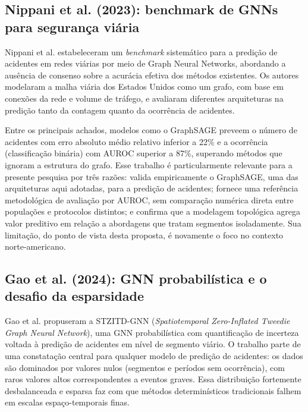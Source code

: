 \documentclass[12pt]{article}
\begin{document}
\subsection{Nippani et al. (2023): benchmark de GNNs para segurança viária}

Nippani et al. \cite{nippani2023} estabeleceram um \textit{benchmark}
sistemático para a predição de acidentes em redes viárias por meio de
Graph Neural Networks, abordando a ausência de consenso sobre a acurácia
efetiva dos métodos existentes. Os autores modelaram a malha viária dos
Estados Unidos como um grafo, com base em conexões da rede e volume de
tráfego, e avaliaram diferentes arquiteturas na predição tanto da
contagem quanto da ocorrência de acidentes.

Entre os principais achados, modelos como o GraphSAGE preveem o número
de acidentes com erro absoluto médio relativo inferior a 22\% e a
ocorrência (classificação binária) com AUROC superior a 87\%, superando
métodos que ignoram a estrutura do grafo. Esse trabalho é particularmente
relevante para a presente pesquisa por três razões: valida
empiricamente o GraphSAGE, uma das arquiteturas aqui adotadas,
para a predição de acidentes; fornece uma referência metodológica de
avaliação por AUROC, sem comparação numérica direta entre populações
e protocolos distintos; e
confirma que a modelagem topológica agrega valor preditivo em relação a
abordagens que tratam segmentos isoladamente. Sua limitação, do ponto de
vista desta proposta, é novamente o foco no contexto norte-americano.

\subsection{Gao et al. (2024): GNN probabilística e o desafio da esparsidade}

Gao et al. \cite{zhuang2024} propuseram a STZITD-GNN
(\textit{Spatiotemporal Zero-Inflated Tweedie Graph Neural Network}),
uma GNN probabilística com quantificação de incerteza voltada à predição
de acidentes em nível de segmento viário. O trabalho parte de uma
constatação central para qualquer modelo de predição de acidentes: os
dados são dominados por valores nulos (segmentos e períodos sem
ocorrência), com raros valores altos correspondentes a eventos graves.
Essa distribuição fortemente desbalanceada e esparsa faz com que métodos
determinísticos tradicionais falhem em escalas espaço-temporais finas.
\end{document}
